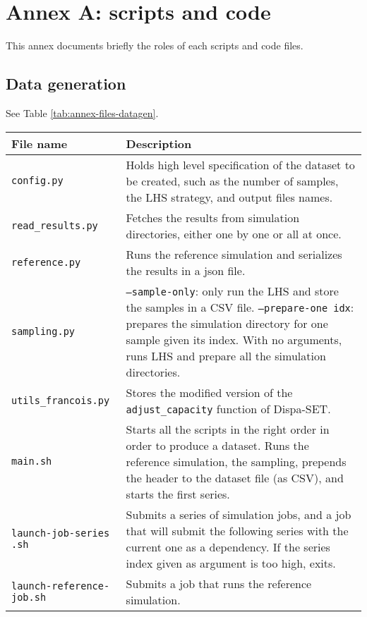 \addtocounter{section}{1}
\section*{Annex A: scripts and code}

This annex documents briefly the roles of each scripts and code files.

\subsection*{Data generation}

See Table \ref{tab:annex-files-datagen}.

\begin{table}[h]
    \centering
    \begin{tabular}{|p{}|p{}|}
        \hline
        File name & Description \\ \hline
        \texttt{config.py} & Holds high level specification of the dataset to be created, such as the number of samples, the LHS strategy, and output files names. \\
        \texttt{read\_results.py} & Fetches the results from simulation directories, either one by one or all at once. \\
        \texttt{reference.py} & Runs the reference simulation and serializes the results in a json file. \\
        \texttt{sampling.py} & \texttt{--sample-only}: only run the LHS and store the samples in a CSV file. \texttt{--prepare-one idx}: prepares the simulation directory for one sample given its index. With no arguments, runs LHS and prepare all the simulation directories. \\
        \texttt{utils\_francois.py} & Stores the modified version of the \texttt{adjust\_capacity} function of Dispa-SET. \\ \hline
        \texttt{main.sh} & Starts all the scripts in the right order in order to produce a dataset. Runs the reference simulation, the sampling, prepends the header to the dataset file (as CSV), and starts the first series. \\
        \texttt{launch-job-series} \texttt{.sh} & Submits a series of simulation jobs, and a job that will submit the following series with the current one as a dependency. If the series index given as argument is too high, exits. \\
        \texttt{launch-reference-} \texttt{job.sh} & Submits a job that runs the reference simulation. \\

\end{tabular}
\end{table}
